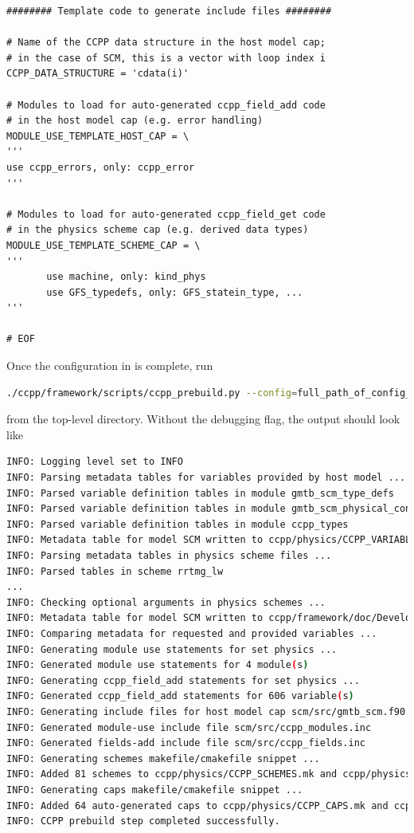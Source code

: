 \begin{lstlisting}
######## Template code to generate include files ########

# Name of the CCPP data structure in the host model cap;
# in the case of SCM, this is a vector with loop index i
CCPP_DATA_STRUCTURE = 'cdata(i)'

# Modules to load for auto-generated ccpp_field_add code
# in the host model cap (e.g. error handling)
MODULE_USE_TEMPLATE_HOST_CAP = \
'''
use ccpp_errors, only: ccpp_error
'''

# Modules to load for auto-generated ccpp_field_get code
# in the physics scheme cap (e.g. derived data types)
MODULE_USE_TEMPLATE_SCHEME_CAP = \
'''
       use machine, only: kind_phys
       use GFS_typedefs, only: GFS_statein_type, ...
'''

# EOF
\end{lstlisting}
\clearpage

Once the configuration in  is complete, run
\begin{lstlisting}[language=bash]
./ccpp/framework/scripts/ccpp_prebuild.py --config=full_path_of_config_file [--debug]
\end{lstlisting}
from the top-level directory. Without the debugging flag, the output should look like
\begin{lstlisting}[language=bash,basicstyle=\scriptsize\ttfamily]
INFO: Logging level set to INFO
INFO: Parsing metadata tables for variables provided by host model ...
INFO: Parsed variable definition tables in module gmtb_scm_type_defs
INFO: Parsed variable definition tables in module gmtb_scm_physical_constants
INFO: Parsed variable definition tables in module ccpp_types
INFO: Metadata table for model SCM written to ccpp/physics/CCPP_VARIABLES_SCM.html
INFO: Parsing metadata tables in physics scheme files ...
INFO: Parsed tables in scheme rrtmg_lw
...
INFO: Checking optional arguments in physics schemes ...
INFO: Metadata table for model SCM written to ccpp/framework/doc/DevelopersGuide/CCPP_VARIABLES_SCM.tex
INFO: Comparing metadata for requested and provided variables ...
INFO: Generating module use statements for set physics ...
INFO: Generated module use statements for 4 module(s)
INFO: Generating ccpp_field_add statements for set physics ...
INFO: Generated ccpp_field_add statements for 606 variable(s)
INFO: Generating include files for host model cap scm/src/gmtb_scm.f90 ...
INFO: Generated module-use include file scm/src/ccpp_modules.inc
INFO: Generated fields-add include file scm/src/ccpp_fields.inc
INFO: Generating schemes makefile/cmakefile snippet ...
INFO: Added 81 schemes to ccpp/physics/CCPP_SCHEMES.mk and ccpp/physics/CCPP_SCHEMES.cmake
INFO: Generating caps makefile/cmakefile snippet ...
INFO: Added 64 auto-generated caps to ccpp/physics/CCPP_CAPS.mk and ccpp/physics/CCPP_CAPS.cmake
INFO: CCPP prebuild step completed successfully.
\end{lstlisting}

